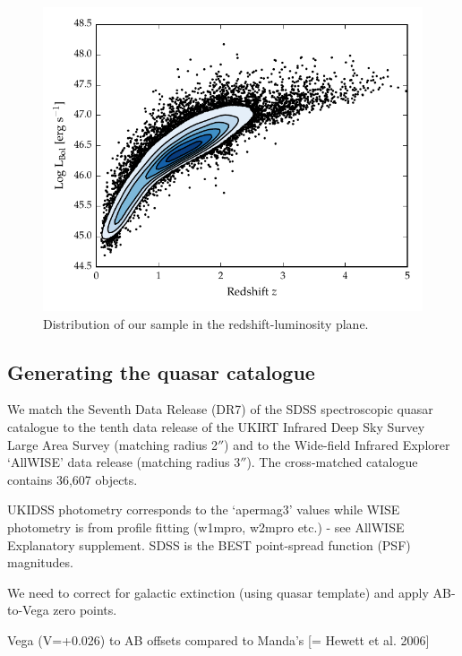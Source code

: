 \begin{figure}
  \centering
  \includegraphics[width=\textwidth]{figures/chapter05/lum_z.pdf}
  \caption{Distribution of our sample in the redshift-luminosity plane.}
  \label{fig:lum_z}
\end{figure}


\subsection{Generating the quasar catalogue}

We match the Seventh Data Release (DR7) of the \ac{SDSS} spectroscopic quasar catalogue \citep{schneider10} to the tenth data release of the UKIRT Infrared Deep Sky Survey \citep[UKIDSS;][]{lawrence07} Large Area Survey (matching radius 2$''$) and to the Wide-field Infrared Explorer \citep[WISE;][]{wright10} `AllWISE' data release (matching radius 3$''$). 
The cross-matched catalogue contains 36,607 objects. 

UKIDSS photometry corresponds to the `apermag3' values while WISE photometry is from profile fitting (w1mpro, w2mpro etc.) - see AllWISE Explanatory supplement. 
SDSS is the BEST point-spread function (PSF) magnitudes.

We need to correct for galactic extinction (using quasar template) and apply AB-to-Vega zero points. 

Vega (V=+0.026) to AB offsets compared to Manda's [= Hewett et al. 2006]

